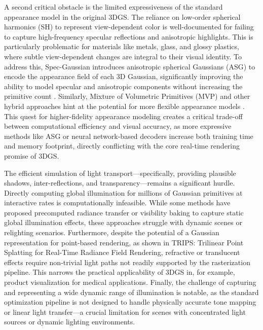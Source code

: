\documentclass[11pt,a4paper]{article}
\begin{document}
A second critical obstacle is the limited expressiveness of the standard appearance model in the original 3DGS. The reliance on low-order spherical harmonics (SH) to represent view-dependent color is well-documented for failing to capture high-frequency specular reflections and anisotropic highlights. This is particularly problematic for materials like metals, glass, and glossy plastics, where subtle view-dependent changes are integral to their visual identity. To address this, Spec-Gaussian introduces anisotropic spherical Gaussians (ASG) to encode the appearance field of each 3D Gaussian, significantly improving the ability to model specular and anisotropic components without increasing the primitive count \cite{arxiv:2402.15870v1}. Similarly, Mixture of Volumetric Primitives (MVP) and other hybrid approaches hint at the potential for more flexible appearance models \cite{arxiv:2103.01954v2}. This quest for higher-fidelity appearance modeling creates a critical trade-off between computational efficiency and visual accuracy, as more expressive methods like ASG or neural network-based decoders increase both training time and memory footprint, directly conflicting with the core real-time rendering promise of 3DGS.

The efficient simulation of light transport---specifically, providing plausible shadows, inter-reflections, and transparency---remains a significant hurdle. Directly computing global illumination for millions of Gaussian primitives at interactive rates is computationally infeasible. While some methods have proposed precomputed radiance transfer or visibility baking to capture static global illumination effects, these approaches struggle with dynamic scenes or relighting scenarios. Furthermore, despite the potential of a Gaussian representation for point-based rendering, as shown in TRIPS: Trilinear Point Splatting for Real-Time Radiance Field Rendering, refractive or translucent effects require non-trivial light paths not readily supported by the rasterization pipeline. This narrows the practical applicability of 3DGS in, for example, product visualization for medical applications. Finally, the challenge of capturing and representing a wide dynamic range of illumination is notable, as the standard optimization pipeline is not designed to handle physically accurate tone mapping or linear light transfer---a crucial limitation for scenes with concentrated light sources or dynamic lighting environments.
\end{document}
